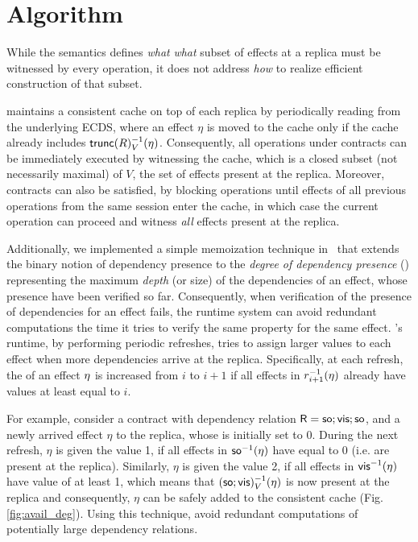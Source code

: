 \section{Algorithm}
\label{sec:alg}

While the semantics defines \emph{what} \emph{what} subset of
effects at a replica  must be witnessed by every operation, it does
not address \emph{how} to realize efficient construction of that subset.

\tool maintains a consistent cache on top of each replica by periodically
reading from the underlying ECDS, where an effect $\eta$ is moved to the
cache only if the cache already includes {\footnotesize
$\trunc{R}_V^{-1}(\eta)$}. Consequently, all operations under \UB{}
contracts can be immediately executed
by witnessing the cache, which is a closed subset (not necessarily maximal) 
of $V$, the set of effects present at the replica. 
Moreover, \LB{} contracts can also be satisfied, by blocking  operations 
until effects of all previous operations from the same session enter
the cache, in which case the current operation can proceed and witness \emph{all}
effects present at the replica.

Additionally, we implemented a simple memoization technique in \tool\
that extends the binary notion of dependency presence to the
\emph{degree of dependency presence} (\DDP{}) representing 
the maximum \emph{depth} (or size) of the dependencies of an effect, whose presence have been
verified so far. 
Consequently, when verification of the presence of
dependencies for an effect fails, the runtime system can avoid redundant
computations the time it tries to verify the same property for the
same effect.
\tool's runtime, by performing
periodic \DDP{} refreshes, tries to assign larger \DDP{} values to each effect
when more dependencies arrive at the replica. 
Specifically, at each refresh, the \DDP{} of an effect $\eta$ is increased from $i$ to $i+1$ if
all effects in $r_{i+1}^{-1}(\eta)$ already have \DDP{} values at least
equal to $i$.

For example, consider a contract with dependency relation
${\normalfont \textsf{R}}={\textsf{so}};{\normalfont \textsf{vis}};{\textsf{so}}$, and a newly arrived effect $\eta$ to the
replica, whose \DDP{} is initially set to 0. 
During the next refresh, $\eta$ is given the value 1, if all
effects in ${\textsf{so}}^{-1}(\eta)$ have \DDP{} equal to 0 (i.e. are present at the
replica). Similarly, $\eta$ is given the value 2, if all effects in
${\normalfont \textsf{vis}}^{-1}(\eta)$ have \DDP{} value of at least 1, which means that 
$({\textsf{so}};{\normalfont \textsf{vis}})^{-1}_V(\eta)$ is now present at the replica and
consequently, $\eta$ can
be safely added to the consistent cache (Fig.\ref{fig:avail_deg}).
Using this technique, \tool avoid redundant computations of potentially large
dependency relations.

